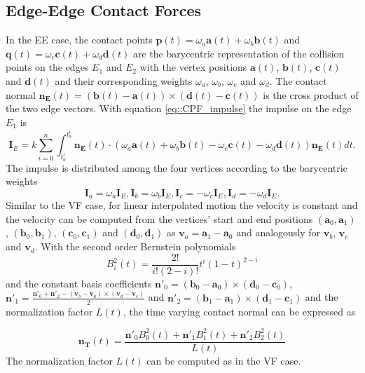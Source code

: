 \subsection{Edge-Edge Contact Forces}
In the EE case, the contact points $\mathbf p(t)=\omega_a \mathbf a(t)+\omega_b \mathbf b(t)$ and $\mathbf q(t)=\omega_c \mathbf c(t)+\omega_d \mathbf d(t) $ are the barycentric representation of the collision points on the edges $E_1$ and $E_2$ with the vertex positions $\mathbf a(t)$, $\mathbf b(t)$, $\mathbf c(t)$ and $\mathbf d(t)$ and their corresponding weights $\omega_a$, $\omega_b$, $\omega_c$ and $\omega_d$.
The contact normal $\mathbf{ n_E}(t) = (\mathbf b(t) - \mathbf a(t))\times(\mathbf d(t) - \mathbf c(t))$ is the cross product of the two edge vectors.  With equation \ref{eq::CPF_impulse} the impulse on the edge $E_1$ is
\begin{equation}
     \mathbf I_E =k \sum\limits_{i=0}^{n}\int_{t_a^i}^{t_b^i} \mathbf{n_E}(t) \cdot   (\omega_a \mathbf a(t)+\omega_b \mathbf b(t)-\omega_c \mathbf c(t)-\omega_d \mathbf d(t)) \mathbf {n_E} (t)dt.
\end{equation}
The impulse is distributed among the four vertices according to the barycentric weights
\begin{equation}
     \mathbf I_a = \omega_a \mathbf I_E, 
     \mathbf I_b = \omega_b \mathbf I_E,
     \mathbf I_c =- \omega_c \mathbf I_E,
     \mathbf I_d =- \omega_d \mathbf I_E.
\end{equation}
Similar to the VF case, for linear interpolated motion the velocity is constant and the velocity can be computed from the vertices' start and end positions  $(\mathbf a_0,\mathbf a_1)$, $(\mathbf b_0,\mathbf b_1)$, $(\mathbf c_0,\mathbf c_1)$  and $(\mathbf d_0,\mathbf d_1)$ as $\mathbf v_a=\mathbf a_1-\mathbf a_0$ and analogously for $\mathbf v_b$, $\mathbf v_c$ and $\mathbf v_d$. With the second order Bernstein polynomials 
\begin{equation}
B^2_i(t)=\frac{2!}{i!(2-i)!}t^i(1-t)^{2-i}
\end{equation}
and the constant basis coefficients $\mathbf n'_0=(\mathbf b_0- \mathbf a_0) \times (\mathbf d_0-\mathbf c_0)$, $\mathbf n'_1= \frac{\mathbf n'_0+ \mathbf n'_2 - (\mathbf v_b-\mathbf v_a) \times (\mathbf v_d - \mathbf v_c)}{2}$ and $\mathbf n'_2=(\mathbf b_1- \mathbf a_1) \times (\mathbf d_1-\mathbf c_1)$ and the normalization factor $L(t)$, the time varying contact normal can be expressed as

\begin{equation}
	\mathbf{n_T}(t)=\frac{\mathbf n'_0 B^2_0(t)+\mathbf n'_1 B^2_1(t)+\mathbf n'_2 B^2_2(t)}{L(t)}
\end{equation}
The normalization factor $L(t)$ can be computed as in the VF case.


